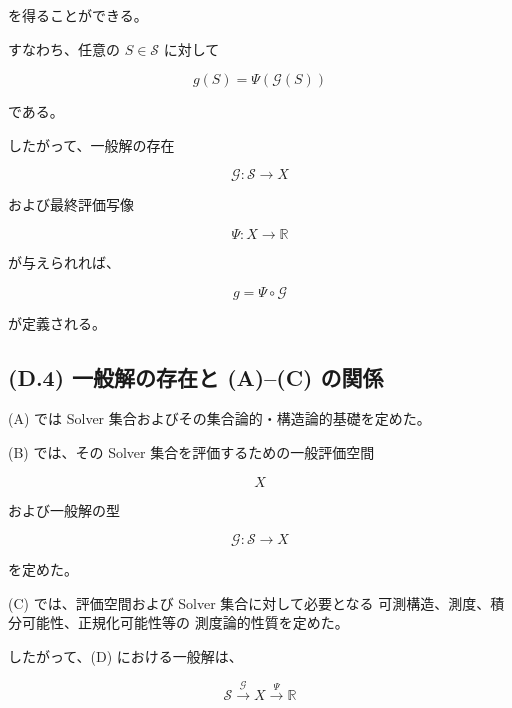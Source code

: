 \documentclass[a4paper,11pt]{article}
\newcommand{\Solver}{\mathcal{S}}
\newcommand{\R}{\mathbb{R}}
\begin{document}
を得ることができる。

すなわち、任意の $S\in\Solver$ に対して

\begin{equation}
    \boxed{
        g(S)
        =
        \Psi\!\left(\mathcal{G}(S)\right)
    }
    \label{eq:D-final-evaluation-explicit}
\end{equation}

である。

したがって、一般解の存在

\begin{equation}
    \mathcal{G}:\Solver\to X
\end{equation}

および最終評価写像

\begin{equation}
    \Psi:X\to\R
\end{equation}

が与えられれば、

\begin{equation}
    g=\Psi\circ\mathcal{G}
\end{equation}

が定義される。


\subsection{(D.4) 一般解の存在と (A)--(C) の関係}
\label{subsec:D4}

(A) では Solver 集合およびその集合論的・構造論的基礎を定めた。

(B) では、その Solver 集合を評価するための一般評価空間

\begin{equation}
    X
\end{equation}

および一般解の型

\begin{equation}
    \mathcal{G}:\Solver\to X
\end{equation}

を定めた。

(C) では、評価空間および Solver 集合に対して必要となる
可測構造、測度、積分可能性、正規化可能性等の
測度論的性質を定めた。

したがって、(D) における一般解は、

\begin{equation}
    \boxed{
    \Solver
    \xrightarrow{\mathcal{G}}
    X
    \xrightarrow{\Psi}
    \R
    }
    \label{eq:D-structure}
\end{equation}
\end{document}
